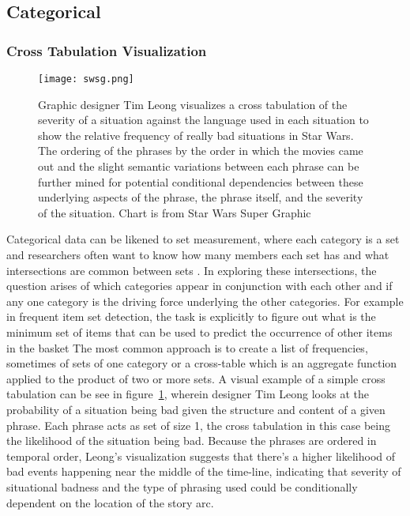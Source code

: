 \documentclass[../main.tex]{subfiles}
\begin{document}
\subsection{Categorical}

\subsubsection{Cross Tabulation Visualization}
\begin{figure}
\texttt{[image: swsg.png]}
\caption{Graphic designer Tim Leong visualizes a cross tabulation of the severity of a situation against the language used in each situation to show the relative frequency of really bad situations in Star Wars. The ordering of the phrases by the order in which the movies came out and the slight semantic variations between each phrase can be further mined for potential conditional dependencies between these underlying aspects of the phrase, the phrase itself, and the severity of the situation. Chart is from Star Wars Super Graphic \cite{leong_star_2017}}
\label{fig:starwars}
\end{figure}

Categorical data can be likened to set measurement, where each category is a set
and researchers often want to know how many members each set has and what
intersections are common between sets \cite{agresti_categorical_2011,schneider_set-theoretic_2012}. In exploring these intersections, the question arises of which categories appear in conjunction with each other and if any one category is the driving force underlying the other categories. For example in frequent item set detection, the task is explicitly to figure out what is the minimum set of items that can be used to predict the occurrence of other items in the basket \cite{leskovec_mining_2014,Srikant:1997:MAR:3001392.3001404} The most common approach is to create a list of frequencies, sometimes of sets of one category or a cross-table\cite{goodman_measures_1991} which is an aggregate function applied to the product of two or more sets. A visual example of a simple cross tabulation can be see in figure~\ref{fig:starwars}, wherein designer Tim Leong looks at the probability of a situation being bad given the structure and content of a given phrase\cite{leong_star_2017}. Each phrase acts as set of size 1, the cross tabulation in this case being the likelihood of the situation being bad. Because the phrases are ordered in temporal order, Leong's visualization suggests that there's a higher likelihood of bad events happening near the middle of the time-line, indicating that severity of situational badness and the type of phrasing used could be conditionally dependent on the location of the story arc. 
\end{document}
